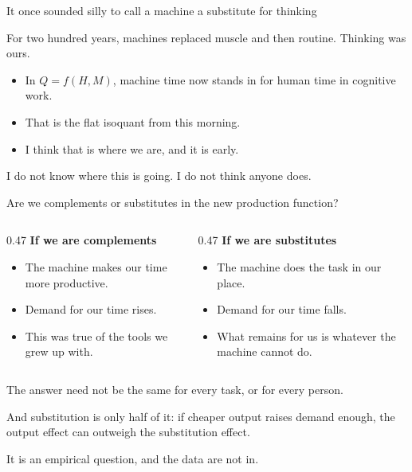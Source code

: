 \documentclass[aspectratio=169,11pt]{beamer}
\begin{document}
\begin{frame}{It once sounded silly to call a machine a substitute for thinking}

For two hundred years, machines replaced muscle and then routine. Thinking was ours.

\vspace{0.35cm}

\begin{itemize}\setlength\itemsep{0.35em}
    \item In $Q = f(H, M)$, machine time now stands in for human time in cognitive work.
    \item That is the flat isoquant from this morning.
    \item I think that is where we are, and it is early.
\end{itemize}

\vspace{0.4cm}

\alert{I do not know where this is going. I do not think anyone does.}

\end{frame}

\begin{frame}{Are we complements or substitutes in the new production function?}

\begin{columns}[T]
\begin{column}{0.47\textwidth}
\textbf{If we are complements}
\begin{itemize}\setlength\itemsep{0.3em}
    \item The machine makes our time more productive.
    \item Demand for our time rises.
    \item This was true of the tools we grew up with.
\end{itemize}
\end{column}
\begin{column}{0.47\textwidth}
\textbf{If we are substitutes}
\begin{itemize}\setlength\itemsep{0.3em}
    \item The machine does the task in our place.
    \item Demand for our time falls.
    \item What remains for us is whatever the machine cannot do.
\end{itemize}
\end{column}
\end{columns}

\vspace{0.3cm}

The answer need not be the same for every task, or for every person.

\vspace{0.2cm}

And substitution is only half of it: if cheaper output raises demand enough, the output effect can outweigh the substitution effect.

\vspace{0.2cm}

\alert{It is an empirical question, and the data are not in.}

\end{frame}
\end{document}
